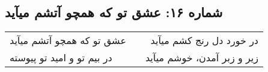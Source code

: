 \begin{center}
\section*{شماره ۱۶: عشق تو که همچو آتشم میآید}
\label{sec:016}
\begin{longtable}{l p{0.5cm} r}
عشق تو که همچو آتشم میآید
&&
در خورد دل رنج کشم میآید
\\
در بیم تو و امید تو پیوسته
&&
زیر و زبر آمدن، خوشم میآید
\\
\end{longtable}
\end{center}
